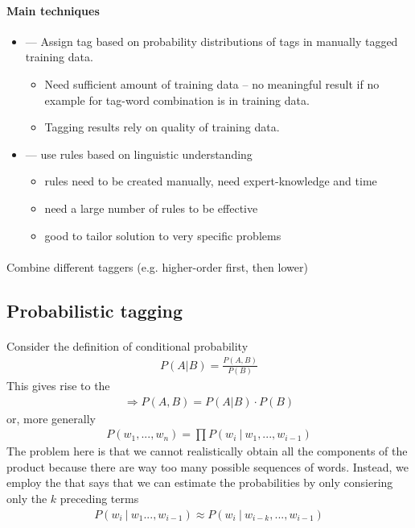 \documentclass[10pt,twocolumn]{article}
\begin{document}
\paragraph{\textbf{Main techniques}}
\begin{itemize}
\item {} --- Assign tag based on probability
  distributions of tags in manually tagged training data.
  \begin{itemize}
  \item Need sufficient amount of training data -- no meaningful result if no
    example for tag-word combination is in training data.
  \item Tagging results rely on quality of training data. 
  \end{itemize}
\item {} --- use rules based on linguistic understanding
  \begin{itemize}
  \item rules need to be created manually, need expert-knowledge and time
  \item need a large number of rules to be effective
  \item good to tailor solution to very specific problems
  \end{itemize}
\end{itemize}

\paragraph{ } Combine different taggers (e.g. higher-order
first, then lower)

\subsection{Probabilistic tagging}

\paragraph{} Consider the definition of {
  conditional probability }
\begin{align*}
  P(A|B) = \frac{P(A,B)}{P(B)} 
\end{align*}
This gives rise to the 
\begin{align*}
  \Rightarrow P(A,B) = P(A|B) \cdot P(B)
\end{align*}
or, more generally
\begin{align*}
  P(w_1, ..., w_n) = \prod P(w_i~|~w_1, ..., w_{i-1})
\end{align*}
The problem here is that we cannot realistically obtain all the components of
the product because there are way too many possible sequences of words. Instead,
we employ the  that says that we can estimate the
probabilities by only consiering only the $k$ preceding terms
\begin{align*}
  P(w_i ~|~ w_1 ..., w_{i-1}) \approx P(w_i ~|~ w_{i-k}, ..., w_{i-1})
\end{align*}
\end{document}
